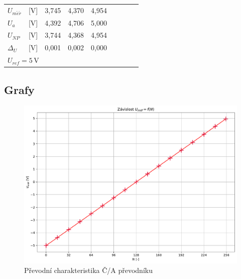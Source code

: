 \documentclass[a4paper, czech]{article}
\begin{document}
\begin{table}[H]
\begin{tabular}{ll|ccccccc}
        \cmidrule(rl){1-5}
        $U_{m \check{e} \check{r}}$               & [V] & 3,745    & 4,370    & 4,954    \\
        $U_a$                 & [V]                     & 4,392    & 4,706    & 5,000    \\
        $U_{NP}$                & [V]                   & 3,744    & 4,368    & 4,954    \\
        $\Delta_U$                 & [V]                & 0,001    & 0,002    & 0,000    \\
        \cmidrule[0.8pt]{1-5}
        \multicolumn{9}{l}{$U_{ref} = 5$\,V}
    \end{tabular}
\end{table}

\subsection{Grafy}

\begin{figure}[H]
    \centering
    \includegraphics[width=\textwidth]{grafy/graf1.pdf}
    \caption{Převodní charakteristika Č/A převodníku}
\end{figure}
\end{document}
